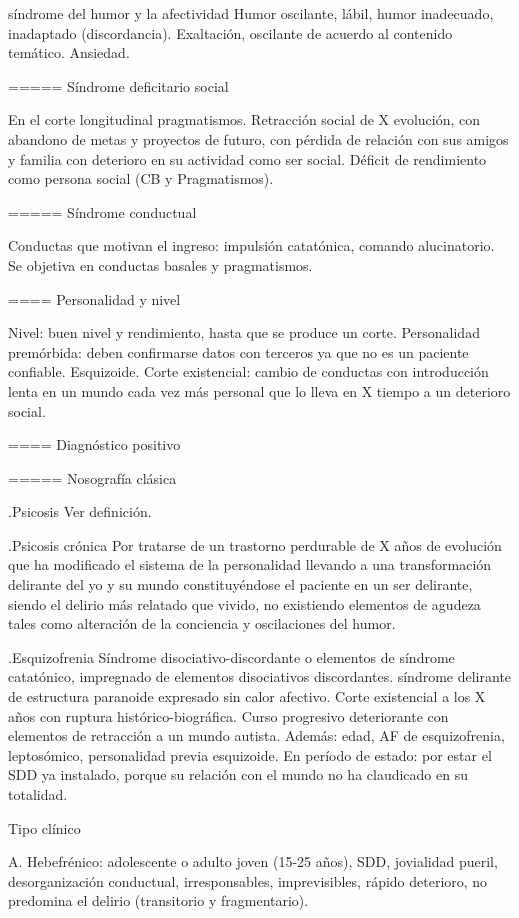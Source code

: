 \documentclass{scrbook}
\begin{document}
síndrome del humor y la afectividad Humor oscilante, lábil, humor inadecuado, inadaptado (discordancia). Exaltación, oscilante de acuerdo al contenido temático. Ansiedad.

===== Síndrome deficitario social

En el corte longitudinal pragmatismos. Retracción social de X evolución, con abandono de metas y proyectos de futuro, con pérdida de relación con sus amigos y familia con deterioro en su actividad como ser social. Déficit de rendimiento como persona social (CB y Pragmatismos).

===== Síndrome conductual

Conductas que motivan el ingreso: impulsión catatónica, comando alucinatorio. Se objetiva en conductas basales y pragmatismos.

==== Personalidad y nivel

Nivel: buen nivel y rendimiento, hasta que se produce un corte. Personalidad premórbida: deben confirmarse datos con terceros ya que no es un paciente confiable. Esquizoide. Corte existencial: cambio de conductas con introducción lenta en un mundo cada vez más personal que lo lleva en X tiempo a un deterioro social.

==== Diagnóstico positivo

===== Nosografía clásica

.Psicosis
Ver definición.

.Psicosis crónica
Por tratarse de un trastorno perdurable de X años de evolución que ha modificado el sistema de la personalidad llevando a una transformación delirante del yo y su mundo constituyéndose el paciente en un ser delirante, siendo el delirio más relatado que vivido, no existiendo elementos de agudeza tales como alteración de la conciencia y oscilaciones del humor.

.Esquizofrenia
Síndrome disociativo-discordante o elementos de síndrome catatónico, impregnado de elementos disociativos discordantes. síndrome delirante de estructura paranoide expresado sin calor afectivo. Corte existencial a los X años con ruptura histórico-biográfica. Curso progresivo deteriorante con elementos de retracción a un mundo autista. Además: edad, AF de esquizofrenia, leptosómico, personalidad previa esquizoide. En período de estado: por estar el SDD ya instalado, porque su relación con el mundo no ha claudicado en su totalidad.

Tipo clínico

A. Hebefrénico: adolescente o adulto joven (15-25 años), SDD, jovialidad pueril, desorganización conductual, irresponsables, imprevisibles, rápido deterioro, no predomina el delirio (transitorio y fragmentario).
\end{document}

